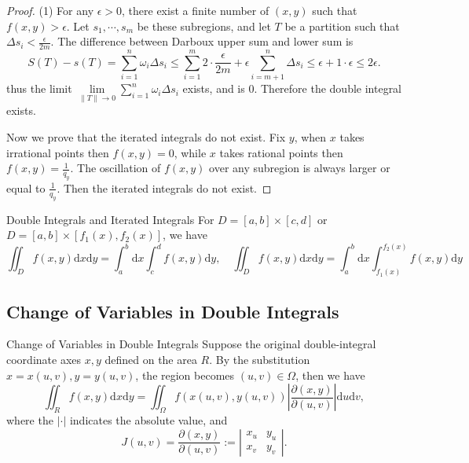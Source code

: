\begin{proof}
  (1) For any $\epsilon > 0$, there exist a finite number of $(x, y)$
  such that $f(x,y) > \epsilon$.
  Let $s_1,\cdots,s_m$ be these subregions,
  and let $T$ be a partition such that $\Delta s_i < \frac{\epsilon}{2m}$.
  The difference between Darboux upper sum and lower sum is
  \begin{equation}
    S(T) - s(T) = \sum\limits_{i = 1}^n \omega_i \Delta s_i
    \leq \sum\limits_{i = 1}^m 2 \cdot \frac{\epsilon}{2m} +  \epsilon \sum\limits_{i = m+1}^n \Delta s_i
    \leq \epsilon + 1 \cdot \epsilon
    \leq 2 \epsilon.
  \end{equation}
  thus the limit $\lim \limits _{\|T\| \rightarrow 0} \sum\limits_{i = 1}^n
  \omega_i \Delta s_i$ exists, and is $0$. Therefore the double integral exists.

  Now we prove that the iterated integrals do not exist.
  Fix $y$, when $x$ takes irrational points then $f(x,y) = 0$,
  while $x$ takes rational points then $f(x,y)=\frac{1}{q_y}$.
  The oscillation of $f(x,y)$ over any subregion is always larger or equal to $\frac{1}{q_y}$.
  Then the iterated integrals do not exist.
\end{proof}

\begin{proposition}{Double Integrals and Iterated Integrals}{}
  For $D = [a, b] \times [c, d]$ or $D = [a, b] \times [f_1(x), f_2(x)]$,
  we have
  \begin{equation}
    \iint_Df(x,y)\mathrm{d}x\mathrm{d}y=\int_a^b\mathrm{d}x\int_c^df(x,y)\mathrm{d}y,\quad
    \iint_Df(x,y)\mathrm{d}x\mathrm{d}y=\int_a^b\mathrm{d}x\int_{f_1(x)}^{f_2(x)}f(x,y)\mathrm{d}y
  \end{equation}
\end{proposition}

\subsection{Change of Variables in Double Integrals}

\begin{proposition}{Change of Variables in Double Integrals}{}
  Suppose the original double-integral coordinate axes $x, y$ defined on the
  area $R$.
  By the substitution $x = x(u, v), y = y(u, v)$, the region becomes $(u, v) \in
  \Omega$, then we have
  \begin{equation}
    \iint_Rf(x,y)\mathrm{d}x\mathrm{d}y=\iint_\Omega f(x(u,v),y(u,v))\left|\frac{\partial(x,y)}{\partial(u,v)}\right|\mathrm{d}u\mathrm{d}v,
  \end{equation}
  where the $|\cdot|$ indicates the absolute value, and
  \begin{equation}
    J(u,v) = \frac{\partial (x, y)}{\partial (u, v)} := \left|
      \begin{array}{cc}
        x_u&y_u\\
        x_v&y_v
      \end{array}
    \right|.
  \end{equation}
\end{proposition}

